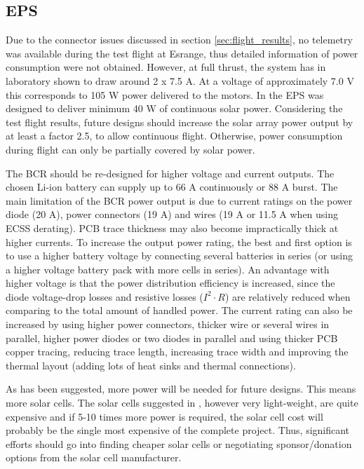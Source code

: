 \subsection{EPS}
Due to the connector issues discussed in section \ref{sec:flight_results}, no telemetry was available during the test flight at Esrange, thus detailed information of power consumption were not obtained. However, at full thrust, the system has in laboratory shown to draw around 2 x 7.5 A. At a voltage of approximately 7.0 V this corresponds to 105 W power delivered to the motors. In \cite{CDR} the \ac{EPS} was designed to deliver minimum 40 W of continuous solar power. Considering the test flight results, future designs should increase the solar array power output by at least a factor 2.5, to allow continuous flight. Otherwise, power consumption during flight can only be partially covered by solar power.
 
The \ac{BCR} should be re-designed for higher voltage and current outputs. The chosen Li-ion battery can supply up to 66 A continuously or 88 A burst. The main limitation of the \ac{BCR} power output is due to current ratings on the power diode (20 A), power connectors (19 A) and wires (19 A or 11.5 A when using ECSS derating\cite{ECSS_derating}). PCB trace thickness may also become impractically thick at higher currents. 
To increase the output power rating, the best and first option is to use a higher battery voltage by connecting several batteries in series (or using a higher voltage battery pack with more cells in series). An advantage with higher voltage is that the power distribution efficiency is increased, since the diode voltage-drop losses and resistive losses ($I^2 \cdot R$) are relatively reduced when comparing to the total amount of handled power. 
The current rating can also be increased by using higher power connectors, thicker wire or several wires in parallel, higher power diodes or two diodes in parallel and using thicker PCB copper tracing, reducing trace length, increasing trace width and improving the thermal layout (adding lots of heat sinks and thermal connections). 

As has been suggested, more power will be needed for future designs. This means more solar cells. The solar cells suggested in \cite{CDR}, however very light-weight, are quite expensive and if 5-10 times more power is required, the solar cell cost will probably be the single most expensive of the complete project. Thus, significant efforts should go into finding cheaper solar cells or negotiating sponsor/donation options from the solar cell manufacturer. 

